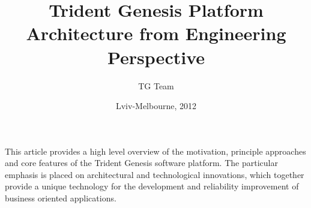 \begin{titlepage}
\AddToShipoutPicture*{\BackgroundPic}
\title{Trident Genesis Platform Architecture from Engineering Perspective}
\author{TG Team}
\date{Lviv-Melbourne, 2012}
\maketitle
\clearpage
\AddToShipoutPicture*{\BackgroundPic}
  This article provides a high level overview of the motivation, principle approaches and core features of the Trident Genesis software platform.
  The particular emphasis is placed on architectural and technological innovations, which together provide a unique technology for the development and reliability improvement of business oriented applications.

\clearpage
\AddToShipoutPicture*{\BackgroundPic}
\tableofcontents
\clearpage

\end{titlepage}